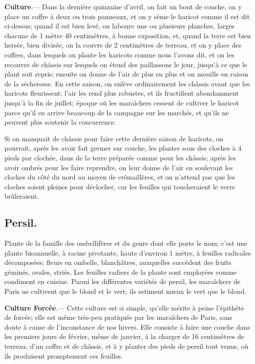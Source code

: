 \documentclass[10pt,a4paper]{book}
\begin{document}
\textbf{Culture}.--- Dans la dernière quinzaine d'avril, on fait un bout de couche, on y place un coffre à deux ou trois panneaux, et on y sème le haricot comme il est dit ci-dessus; quand il est bien levé, on laboure une ou plusieurs planches, larges chacune de 1 mètre 40 centimètres, à bonne exposition, et, quand la terre est bien hersée, bien divisée, on la couvre de 2 centimètres de terreau, et on y place des coffres, dans lesquels on plante les haricots comme nous l'avons dit, et on les recouvre de châssis sur lesquels on étend des paillassons le jour, jusqu'à ce que le plant soit repris; ensuite on donne de l'air de plus en plus et on mouille en raison de la sécheresse. En cette saison, on enlève ordinairement les châssis avant que les haricots fleurissent: l'air les rend plus robustes, et ils fructifient abondamment jusqu'à la fin de juillet; époque où les maraîchers cessent de cultiver le haricot parce qu'il en arrive beaucoup de la campagne sur les marchés, et qu'ils ne peuvent plus soutenir la concurrence.

Si on manquait de châssis pour faire cette dernière saison de haricots, on pourrait, après les avoir fait germer sur couche, les planter sous des cloches à 4 pieds par clochée, dans de la terre préparée comme pour les châssis; après les avoir ombrés pour les faire reprendre, on leur donne de l'air en soulevant les cloches du côté du nord au moyen de crémaillères, et on n'attend pas que les cloches soient pleines pour déclocher, car les feuilles qui toucheraient le verre brûleraient.

\subsection{Persil.}

Plante de la famille des ombellifères et du genre dont elle porte le nom; c'est une plante bisannuelle, à racine pivotante, haute d'environ 1 mètre, à feuilles radicales décomposées: fleurs en ombelle, blanchâtres, auxquelles succèdent des fruits géminés, ovales, striés. Les feuilles radiers de la plante sont employées comme condiment en cuisine. Parmi les différentes variétés de persil, les maraîchers de Paris ne cultivent que le blond et le vert; ils estiment mieux le vert que le blond.

\textbf{Culture Forcée}.--- Cette culture est si simple, qu'elle mérite à peine l’épithète de forcée; elle est même très-peu pratiquée par les maraîchers de Paris, sans doute à cause de l'inconstance de nos hivers. Elle consiste à faire une couche dans les premiers jours de février, même de janvier, à la charger de 16 centimètres de terreau, d'un coffre et de châssis, et à y planter des pieds de persil tout venus, où ils produisent promptement ces feuilles.
\end{document}
